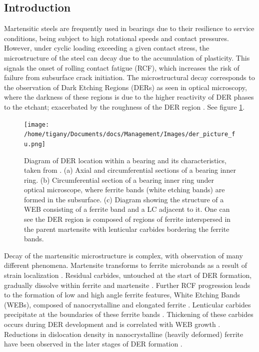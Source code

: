 \documentclass[a4paper,11pt]{article}
\numberwithin{equation}{chapter}
\numberwithin{listing}{chapter}
\begin{document}
\clearpage

\subsection{Introduction}
\label{sec:org74d47d3}

Martensitic steels are frequently used in bearings due to their resilience to service conditions,
being subject to high rotational speeds and contact pressures. However, under cyclic loading
exceeding a given contact stress, the microstructure of the steel can decay due to the accumulation
of plasticity. This signals the onset of rolling contact fatigue (RCF), which increases the risk of
failure from subsurface crack initiation. The microstructural decay corresponds to the observation
of Dark Etching Regions (DERs) as seen in optical microscopy, where the darkness of these regions is due
to the higher reactivity of DER phases to the etchant; exacerbated by
the roughness of the DER region \cite{skf2019}. See figure \ref{fuderpicture}.

\begin{figure}[htbp]
\centering
\texttt{[image: /home/tigany/Documents/docs/Management/Images/der\_picture\_fu.png]}
\caption{Diagram of DER location within a bearing and its characteristics, taken from \cite{Fu2017}. (a) Axial and circumferential sections of a bearing inner ring. (b) Circumferential section of a bearing inner ring under optical microscope, where ferrite bands (white etching bands) are formed in the subsurface. (c) Diagram showing the structure of a WEB consisting of a ferrite band and a LC adjacent to it. One can see the DER region is composed of regions of ferrite interspersed in the parent martensite with lenticular carbides bordering the ferrite bands. \label{fuderpicture}}
\end{figure}


Decay of the martensitic microstructure is complex, with observation of many different
phenomena. Martensite transforms to ferrite microbands as a result of strain localization
\cite{Fu2017,il_micros_alter_rollin_contac_fatig,jonesil_metal_obser_ball_bearin_fatig_phenom,70_micros_microh_resid_stres_chang,Swahn1976,Voskamp1997,voskamp97_state_resid_stres_induc_by,polonsky95_white_etchin_band_format_rollin_bearin,vsmelova17_elect_micros_inves_micros_alter}. Residual
carbides, untouched at the start of DER formation, gradually dissolve within ferrite and
martensite \cite{70_micros_microh_resid_stres_chang,Swahn1976,Osterlund_1980}. Further RCF
progression leads to the formation of low and high angle ferrite features, White Etching Bands
(WEBs), composed of nanocrystalline \cite{Voskamp1997,Osterlund_1980,Mitamura_2007} and elongated
ferrite \cite{vsmelova17_elect_micros_inves_micros_alter}. Lenticular carbides precipitate at the
boundaries of these ferrite bands \cite{Swahn1976,Osterlund_1980}. Thickening of these carbides
occurs during DER development and is correlated with WEB growth
\cite{Fu2017,fu17_strain_induc_marten_decay_bearin,Warhadpande1_2013,Warhadpande2013}. Reductions in
dislocation density in nanocrystalline (heavily deformed) ferrite have been observed in the later
stages of DER formation \cite{skf2019,voskamp80_gradual_chang_resid_stres_micros}.
\end{document}
